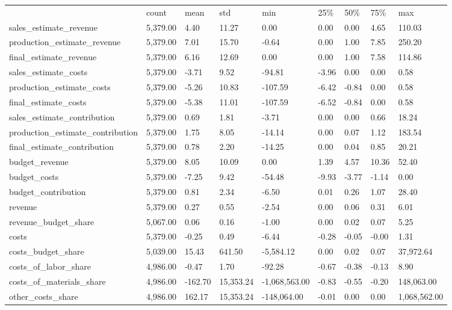 \begin{tabular}{lllllllll}
 & count & mean & std & min & 25\% & 50\% & 75\% & max \\
sales_estimate_revenue & 5,379.00 & 4.40 & 11.27 & 0.00 & 0.00 & 0.00 & 4.65 & 110.03 \\
production_estimate_revenue & 5,379.00 & 7.01 & 15.70 & -0.64 & 0.00 & 1.00 & 7.85 & 250.20 \\
final_estimate_revenue & 5,379.00 & 6.16 & 12.69 & 0.00 & 0.00 & 1.00 & 7.58 & 114.86 \\
sales_estimate_costs & 5,379.00 & -3.71 & 9.52 & -94.81 & -3.96 & 0.00 & 0.00 & 0.58 \\
production_estimate_costs & 5,379.00 & -5.26 & 10.83 & -107.59 & -6.42 & -0.84 & 0.00 & 0.58 \\
final_estimate_costs & 5,379.00 & -5.38 & 11.01 & -107.59 & -6.52 & -0.84 & 0.00 & 0.58 \\
sales_estimate_contribution & 5,379.00 & 0.69 & 1.81 & -3.71 & 0.00 & 0.00 & 0.66 & 18.24 \\
production_estimate_contribution & 5,379.00 & 1.75 & 8.05 & -14.14 & 0.00 & 0.07 & 1.12 & 183.54 \\
final_estimate_contribution & 5,379.00 & 0.78 & 2.20 & -14.25 & 0.00 & 0.04 & 0.85 & 20.21 \\
budget_revenue & 5,379.00 & 8.05 & 10.09 & 0.00 & 1.39 & 4.57 & 10.36 & 52.40 \\
budget_costs & 5,379.00 & -7.25 & 9.42 & -54.48 & -9.93 & -3.77 & -1.14 & 0.00 \\
budget_contribution & 5,379.00 & 0.81 & 2.34 & -6.50 & 0.01 & 0.26 & 1.07 & 28.40 \\
revenue & 5,379.00 & 0.27 & 0.55 & -2.54 & 0.00 & 0.06 & 0.31 & 6.01 \\
revenue_budget_share & 5,067.00 & 0.06 & 0.16 & -1.00 & 0.00 & 0.02 & 0.07 & 5.25 \\
costs & 5,379.00 & -0.25 & 0.49 & -6.44 & -0.28 & -0.05 & -0.00 & 1.31 \\
costs_budget_share & 5,039.00 & 15.43 & 641.50 & -5,584.12 & 0.00 & 0.02 & 0.07 & 37,972.64 \\
costs_of_labor_share & 4,986.00 & -0.47 & 1.70 & -92.28 & -0.67 & -0.38 & -0.13 & 8.90 \\
costs_of_materials_share & 4,986.00 & -162.70 & 15,353.24 & -1,068,563.00 & -0.83 & -0.55 & -0.20 & 148,063.00 \\
other_costs_share & 4,986.00 & 162.17 & 15,353.24 & -148,064.00 & -0.01 & 0.00 & 0.00 & 1,068,562.00 \\

\end{tabular}
